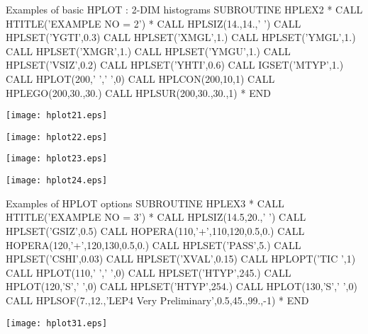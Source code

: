 \newpage

\begin{XMPt}{Examples of basic HPLOT : 2-DIM histograms}
      SUBROUTINE HPLEX2
*
      CALL HTITLE('EXAMPLE NO = 2')
*
      CALL HPLSIZ(14.,14.,' ')
      CALL HPLSET('YGTI',0.3)
      CALL HPLSET('XMGL',1.)
      CALL HPLSET('YMGL',1.)
      CALL HPLSET('XMGR',1.)
      CALL HPLSET('YMGU',1.)
      CALL HPLSET('VSIZ',0.2)
      CALL HPLSET('YHTI',0.6)
      CALL IGSET('MTYP',1.)
      CALL HPLOT(200,' ',' ',0)
      CALL HPLCON(200,10,1)
      CALL HPLEGO(200,30.,30.)
      CALL HPLSUR(200,30.,30.,1)
*
      END
\end{XMPt}
\newpage
\begin{Fighere}
\begin{center}\texttt{[image: hplot21.eps]}\end{center}
\end{Fighere}
\begin{Fighere}
\begin{center}\texttt{[image: hplot22.eps]}\end{center}
\end{Fighere}
\begin{Fighere}
\begin{center}\texttt{[image: hplot23.eps]}\end{center}
\end{Fighere}
\begin{Fighere}
\begin{center}\texttt{[image: hplot24.eps]}\end{center}
\end{Fighere}

\newpage

\begin{XMPt}{Examples of HPLOT options}
      SUBROUTINE HPLEX3
*
      CALL HTITLE('EXAMPLE NO = 3')
*
      CALL HPLSIZ(14.5,20.,' ')
      CALL HPLSET('GSIZ',0.5)
      CALL HOPERA(110,'+',110,120,0.5,0.)
      CALL HOPERA(120,'+',120,130,0.5,0.)
      CALL HPLSET('PASS',5.)
      CALL HPLSET('CSHI',0.03)
      CALL HPLSET('XVAL',0.15)
      CALL HPLOPT('TIC ',1)
      CALL HPLOT(110,' ',' ',0)
      CALL HPLSET('HTYP',245.)
      CALL HPLOT(120,'S',' ',0)
      CALL HPLSET('HTYP',254.)
      CALL HPLOT(130,'S',' ',0)
      CALL HPLSOF(7.,12.,'LEP4 Very Preliminary',0.5,45.,99.,-1)
*
      END
\end{XMPt}
\newpage
\begin{Fighere}
\begin{center}\texttt{[image: hplot31.eps]}\end{center}
\end{Fighere}

